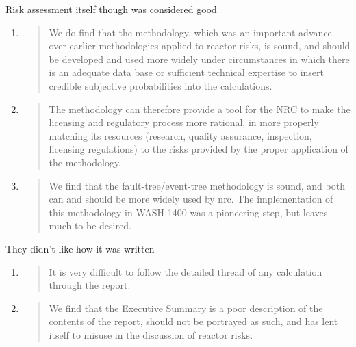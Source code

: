 \documentclass[aspectratio=1610,pdftex,dvipsnames,compress,xcolor={dvipsnames}]{beamer}
\newcommand{\acs}{\acrshort} %
\begin{document}
\begin{frame}{Risk assessment itself though was considered good}
    \begin{enumerate}[series=outerlist,topsep=0pt,itemsep=21pt,leftmargin=*,label=(\arabic*)]
        \item[]
            \begin{quote}
                We do find that the methodology, which was an important advance over earlier methodologies applied to reactor risks, is sound, and should be developed and used more widely under circumstances in which there is an adequate data base or sufficient technical expertise to insert credible subjective probabilities into the calculations.
            \end{quote}
        \item[]
            \begin{quote}
                The methodology can therefore provide a tool for the NRC to make the licensing and regulatory process more rational, in more properly matching its resources (research, quality assurance, inspection, licensing regulations) to the risks provided by the proper application of the methodology.
            \end{quote}
        \item[]
            \begin{quote}
                We find that the fault-tree/event-tree methodology is sound, and both can and should be more widely used by \acs{nrc}. The implementation of this methodology in WASH-1400 was a pioneering step, but leaves much to be desired.
            \end{quote}
    \end{enumerate}
\end{frame}


\begin{frame}{They didn't like how it was written}
    \begin{enumerate}[series=outerlist,topsep=0pt,itemsep=21pt,leftmargin=*,label=(\arabic*)]
        \item[]
            \begin{quote}
                It is very difficult to follow the detailed thread of any calculation through the report.
            \end{quote}
        \item[]
            \begin{quote}
                We find that the Executive Summary is a poor description of the contents of the report, should not be portrayed as such, and has lent itself to misuse in the discussion of reactor risks.
            \end{quote}
    \end{enumerate}
\end{frame}
\end{document}
